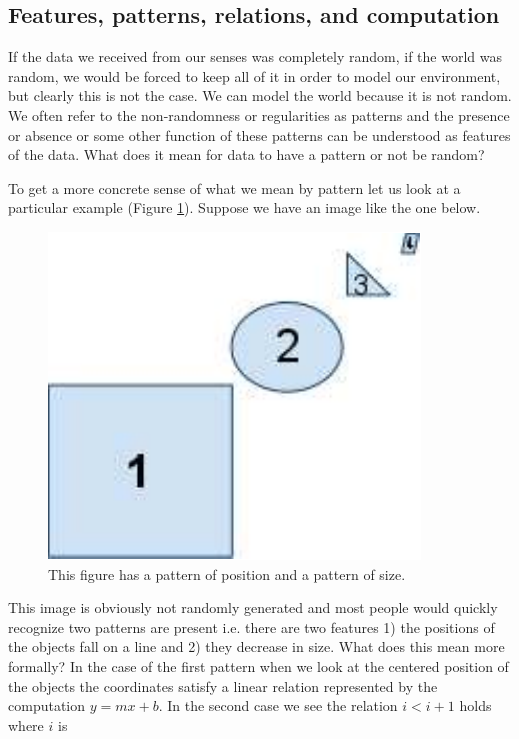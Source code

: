 \documentclass[doc]{apa}%
\begin{document}
\subsection{Features, patterns, relations, and computation}
If the data we received from our senses was completely random, if the
world was random, we would be forced to keep all of it in order to
model our environment, but clearly this is not the case.  We can model
the world because it is not random.  We often refer to the
non-randomness or regularities as patterns and the presence or absence
or some other function of these patterns can be
understood as features of the data.  What does it mean for data to
have a pattern or not be random?
 
To get a more concrete sense of what we mean by pattern let us look at
a particular example (Figure \ref{fig:patterns}).  Suppose we have an image like the one below. 
\begin{figure}[htbp]
\begin{center}
\includegraphics[scale=.5]{patterns.pdf}
\caption{This figure has a pattern of position and a pattern of size. }
\label{fig:patterns}
\end{center}
\end{figure}
This image is obviously not randomly generated and most people would
quickly recognize two patterns are present i.e. there are two features
1) the positions of the objects fall on a line and 2) they decrease in
size.  What does this mean more formally?  In the case of the first
pattern when we look at the centered position of the objects the
coordinates satisfy a linear relation represented by the computation
$y=mx+b$.  In the second case we see the relation $i<i+1$ holds where $i$ is
\end{document}
